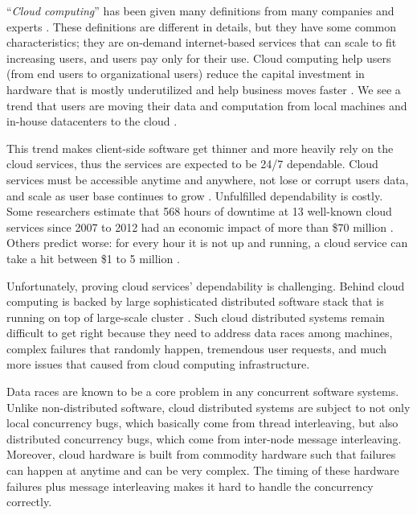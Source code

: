 ``\textit{Cloud computing}'' has been given many definitions from many companies
and experts \cite{TwentyoneCloudDef, IBMCloudDef, PCMagCloudDef,
Foster+08-CloudAndGrid}. These definitions are different in details, but they
have some common characteristics; they are on-demand internet-based services
that can scale to fit increasing users, and users pay only for their use.
%
Cloud computing help users (from end users to organizational users) reduce the
capital investment in hardware that is mostly underutilized
\cite{Hayes+08-CloudComputing} and help business moves faster
\cite{Marston+11-CloudBusiness}. We see a trend that users are moving their data
and computation from local machines and in-house datacenters to the cloud
\cite{AdobeCloudStat, AWSCustomer, GmailStat, GoogleDriveStat, DropboxStat,
AstroInCloud, FacebookStat, Luo+16-BigDataBioResearch}.

This trend makes client-side software get thinner and more heavily rely on the
cloud services, thus the services are expected to be 24/7 dependable. Cloud
services must be accessible anytime and anywhere, not lose or corrupt users
data, and scale as user base continues to grow \cite{Buyya+09-Cloud5thUtil}.
%
Unfulfilled dependability is costly. Some researchers estimate that 568 hours of
downtime at 13 well-known cloud services since 2007 to 2012 had an economic
impact of more than \$70 million \cite{Essers12-70Million}. Others predict
worse: for every hour it is not up and running, a cloud service can take a hit
between \$1 to 5 million \cite{Linthicum13-InfoworldCostOutages}.

Unfortunately, proving cloud services' dependability is challenging. Behind 
cloud computing is backed by large sophisticated distributed software stack
\cite{Burrows06-Chubby, Chang+06-BigTable, Chapin+95-Hive, Corbett+12-Spanner,
DeanGhemawat04-MapReduce, DeCandia+07-Dynamo, Ghemawat+03-GoogleFS,
Hunt+10-ZooKeeperPaper, Lakshman+09-Cassandra, Melnik+10-DremelInteractive,
Zaharia+12-RDD} that is running on top of large-scale cluster
\cite{WikiCassandra, RunningNetflix13, LargestHadoop}.  Such cloud distributed
systems remain difficult to get right because they need to address data races
among machines, complex failures that randomly happen, tremendous user
requests, and much more issues that caused from cloud computing infrastructure.

Data races are known to be a core problem in any concurrent software systems.
Unlike non-distributed software, cloud distributed systems are subject to not
only local concurrency bugs, which basically come from thread interleaving, but
also distributed concurrency bugs, which come from inter-node message
interleaving.  Moreover, cloud hardware is built from commodity hardware such
that failures can happen at anytime and can be very complex. The timing of these
hardware failures plus message interleaving makes it hard to handle the
concurrency correctly.

